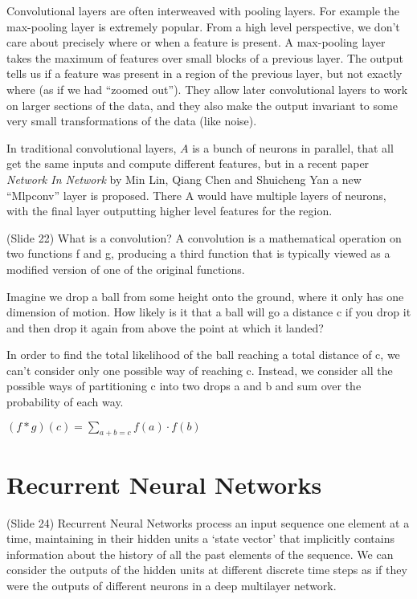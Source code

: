 \documentclass[twocolumn]{article}
\begin{document}
Convolutional layers are often interweaved with pooling layers. For example the
max-pooling layer is extremely popular. From a high level perspective, we don’t
care about precisely where or when a feature is present. A max-pooling layer
takes the maximum of features over small blocks of a previous layer. The output
tells us if a feature was present in a region of the previous layer, but not
exactly where (as if we had “zoomed out”). They allow later convolutional layers
to work on larger sections of the data, and they also make the output invariant
to some very small transformations of the data (like noise).

In traditional convolutional layers, \(A\) is a bunch of neurons in parallel,
that all get the same inputs and compute different features, but in a recent
paper \textit{Network In Network} by Min Lin, Qiang Chen and Shuicheng Yan a new
“Mlpconv” layer is proposed. There A would have multiple layers of neurons, with
the final layer outputting higher level features for the region.

(Slide 22) What is a convolution? A convolution is a mathematical operation on
two functions f and g, producing a third function that is typically viewed as a
modified version of one of the original functions.

Imagine we drop a ball from some height onto the ground, where it only has one
dimension of motion. How likely is it that a ball will go a distance c if you
drop it and then drop it again from above the point at which it landed?

In order to find the total likelihood of the ball reaching a total distance of
c, we can’t consider only one possible way of reaching c. Instead, we consider
all the possible ways of partitioning c into two drops a and b and sum over the
probability of each way.

\((f \ast g)(c) = \sum_{a+b=c} f(a) \cdot f(b)\)

\section{Recurrent Neural Networks}
(Slide 24) Recurrent Neural Networks process an input sequence one element at a
time, maintaining in their hidden units a ‘state vector’ that implicitly
contains information about the history of all the past elements of the
sequence. We can consider the outputs of the hidden units at different discrete
time steps as if they were the outputs of different neurons in a deep multilayer
network.
\end{document}
